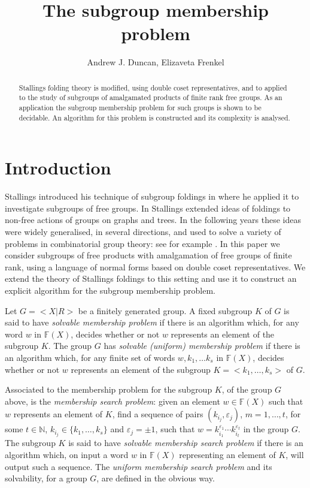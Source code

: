 \documentclass[a4paper,12pt]{article}
\title{The subgroup membership problem
}
\author{Andrew J. Duncan, Elizaveta Frenkel}
\newcommand{\e}{\varepsilon }
\numberwithin{equation}{section}
\numberwithin{figure}{section}
\newcommand{\NN}{\ensuremath{\mathbb{N}}}
\newcommand{\FF}{\ensuremath{\mathbb{F}}}
\begin{document}
\maketitle

\begin{abstract}
Stallings folding theory is modified, using double coset representatives, and to applied
to the study of subgroups of  amalgamated
products of finite rank free groups. As an application the
 subgroup membership
problem for such groups is shown to be decidable. An algorithm for this
problem is constructed and its complexity is analysed.
 \end{abstract}



\section{Introduction}\label{se:global_intro}

Stallings introduced his technique of subgroup foldings in
\cite{stallings83} where he applied it to investigate subgroups of
free groups. In \cite{stallings88} Stallings extended ideas of
foldings to non-free actions of groups on graphs and trees. In the following
years these ideas were widely generalised, in several
directions,  and used to solve a variety of  problems in
combinatorial group theory: see for example
\cite{befe,BoWei,KM02,SilvaWeil08}.
In this paper we consider  subgroups
of free products with amalgamation of free groups of finite rank, using
a language of normal forms based on double coset representatives.  We
extend the theory  of Stallings foldings to this setting and use it to construct an
explicit algorithm for the subgroup membership problem.

Let $G = <X|R>$ be a finitely generated group.
A fixed subgroup $K$ of $G$ is said to have
\emph{solvable  membership problem} if there is an algorithm which, for
any word $w$ in $\FF(X)$, decides
whether or not $w$ represents an element of  the subgroup $K$.
The group $G$ has
\emph{solvable  (uniform) membership problem} if there is an algorithm which, for
any finite set of words $w, k_1, \ldots k_s$ in $\FF(X)$, decides
whether or not $w$ represents an element of  the subgroup $K = <k_1,
\ldots, k_s>$ of $G$. 

Associated to the membership problem for the subgroup $K$, of the group $G$
above, is the \emph{membership search problem}: given an element $w\in \FF(X)$ such
that $w$ represents an element of $K$, find a sequence of pairs 
$(k_{i_j},\e_j)$, $m=1,\ldots ,t$, for some $t\in \NN$, $k_{i_j}\in \{k_1,\ldots, k_s\}$
and $\e_j=\pm 1$,  such that 
$w=k_{i_1}^{\e_1}\cdots k_{i_t}^{\e_t}$ in the group $G$.  The subgroup $K$ 
is said to have
\emph{solvable  membership search problem} if there is an algorithm which, on input 
a word $w$ in $\FF(X)$ representing an element of $K$, will output such
 a sequence. The  \emph{uniform membership search problem} and its solvability, 
for a group $G$, are 
defined
in the obvious way.
\end{document}
